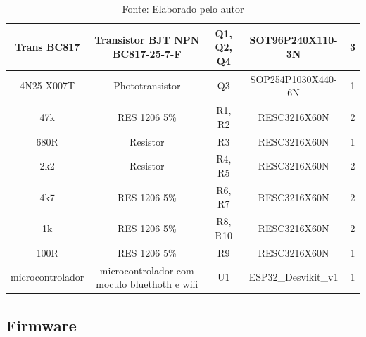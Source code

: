 \documentclass[../delivery_hospital_report.tex]{subfiles}
\begin{document}
\begin{table}[]
\begin{adjustbox}{width=\columnwidth,center}
\begin{tabular}{|c|c|c|c|c|}
Trans BC817      & Transistor BJT NPN   BC817-25-7-F              & Q1, Q2, Q4                                                           & SOT96P240X110-3N    & 3        \\ \hline
4N25-X007T       & Phototransistor                                & Q3                                                                   & SOP254P1030X440-6N  & 1        \\ \hline
47k              & RES 1206 5\%                                   & R1, R2                                                               & RESC3216X60N        & 2        \\ \hline
680R             & Resistor                                       & R3                                                                   & RESC3216X60N        & 1        \\ \hline
2k2              & Resistor                                       & R4, R5                                                               & RESC3216X60N        & 2        \\ \hline
4k7              & RES 1206 5\%                                   & R6, R7                                                               & RESC3216X60N        & 2        \\ \hline
1k               & RES 1206 5\%                                   & R8, R10                                                              & RESC3216X60N        & 2        \\ \hline
100R             & RES 1206 5\%                                   & R9                                                                   & RESC3216X60N        & 1        \\ \hline
microcontrolador & microcontrolador com   moculo bluethoth e wifi & U1                                                                   & ESP32\_Desvikit\_v1 & 1        \\ \hline

\end{tabular}
\end{adjustbox}
\centering
\caption*{Fonte: Elaborado pelo autor}
\label{table:voc}
\end{table}

\subsection{Firmware}
\end{document}
